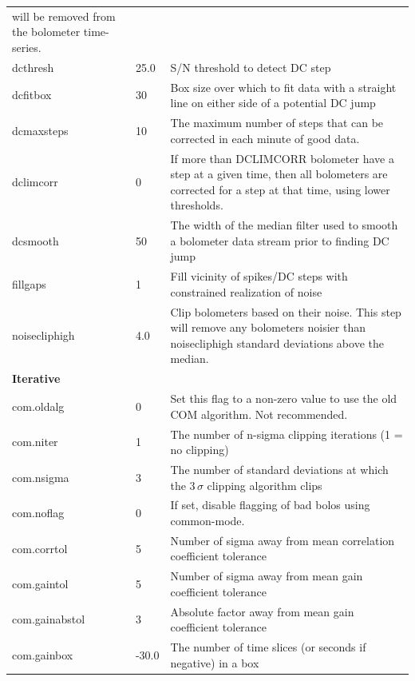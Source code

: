 \documentclass[twoside,11pt]{article}
\renewcommand{\_}{\texttt{\symbol{95}}}
\begin{document}
\begin{htmlonly}
\begin{table}
\begin{center}
\begin{footnotesize}
\begin{tabular}{|p{2.2cm}|p{1.1cm}|p{11.4cm}|}
                        will be removed from the bolometer time-series.\\
dcthresh      &  25.0 & S/N threshold to detect DC step\\
dcfitbox      &    30 & Box size over which to fit data with a straight
                        line on either side of a potential DC jump\\
dcmaxsteps    &    10 & The maximum number of steps that can be corrected
                        in each minute of good data.\\
dclimcorr     &     0 & If more than DCLIMCORR bolometer have a step at
                        a given time, then all bolometers are corrected for
                        a step at that time, using lower thresholds.\\
dcsmooth      &    50 & The width of the median filter used to smooth a
                        bolometer data stream prior to finding DC jump\\
fillgaps      &     1 & Fill vicinity of spikes/DC steps with constrained
                        realization of noise\\
noisecliphigh &   4.0 & Clip bolometers based on their noise. This step
                        will remove any bolometers noisier than noisecliphigh
                        standard deviations above the median.\\
\hline
\multicolumn{3}{|l|}{\textbf{Iterative}}\\
\hline
com.oldalg       &    0 & Set this flag to a non-zero value to use the old COM
                          algorithm. Not recommended.\\
com.niter        &    1 & The number of n-sigma clipping iterations (1 = no clipping)\\
com.nsigma       &    3 & The number of standard deviations at which the 3\,$\sigma$
                           clipping algorithm clips\\
com.noflag       &    0 & If set, disable flagging of bad bolos using common-mode.\\
com.corr\_tol    &    5 & Number of sigma away from mean correlation coefficient tolerance\\
com.gain\_tol    &    5 & Number of sigma away from mean gain coefficient tolerance\\
com.gain\_abstol &    3 & Absolute factor away from mean gain coefficient tolerance\\
com.gain\_box    &-30.0 & The number of time slices (or seconds if negative)
                          in a box\\

\end{tabular}
\end{footnotesize}
\end{center}
\end{table}
\end{htmlonly}
\end{document}
